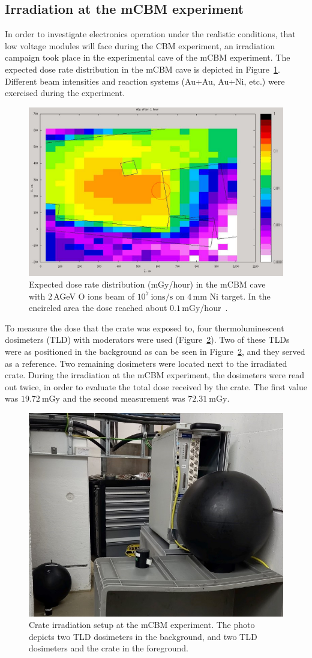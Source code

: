\subsection{Irradiation at the mCBM experiment}
In order to investigate electronics operation under the realistic conditions, that low voltage modules will face during the CBM experiment, an irradiation campaign took place in the experimental cave of the \gls{mCBM} experiment. The expected dose rate distribution in the \gls{mCBM} cave is depicted in Figure~\ref{fig:CBM1}. Different beam intensities and reaction systems (Au+Au, Au+Ni, etc.) were exercised during the experiment.
\begin{figure}[!h]
    \centering
    \includegraphics[width=0.65\columnwidth]{Chapter4/images/dose1.jpg}
    \caption{Expected dose rate distribution (mGy/hour) in the \gls{mCBM} cave with $2$\,AGeV O ions beam of $10^{7}\mathrm{\ ions/s}$ on $4$\,mm Ni target. In the encircled area the dose reached about $0.1$\,mGy/hour~\cite{fluka_senger}.}
     \label{fig:CBM1}
\end{figure}


To measure the dose that the crate was exposed to, four thermoluminescent dosimeters (\gls{TLD}) with moderators were used (Figure~\ref{fig:crate}). Two of these TLDs were as positioned in the background as can be seen in Figure~\ref{fig:crate}, and they served as a reference. Two remaining dosimeters were located next to the irradiated crate. During the irradiation at the \gls{mCBM} experiment, the dosimeters were read out twice, in order to evaluate the total dose received by the crate. The first value was $19.72\mathrm{\ mGy}$ and  the second measurement was $72.31\mathrm{\ mGy}$. 


\newpage
\begin{figure}[!h]
    \centering
    \includegraphics[width=0.5\columnwidth]{Chapter4/images/crate.jpg}
    \caption{Crate irradiation setup at the \gls{mCBM} experiment. The photo depicts two TLD dosimeters in the background, and two TLD dosimeters and the crate in the foreground.}
    \label{fig:crate}
\end{figure}


